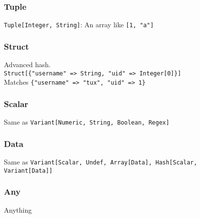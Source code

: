 \begin{frame}\frametitle{Tuple}
    \begin{center}
\LARGE
\texttt{Tuple[Integer, String]}: An array like \texttt{[1, "a"]}
    \end{center}
\end{frame}
\begin{frame}\frametitle{Struct}
    \begin{center}
\LARGE
Advanced hash.\\
\texttt{Struct[\{"username" => String, "uid" => Integer[0]\}]}\\
Matches \texttt{\{"username" => "tux", "uid" => 1\}}
    \end{center}
\end{frame}
\begin{frame}\frametitle{Scalar}
    \begin{center}
\LARGE
Same as \texttt{Variant[Numeric, String, Boolean, Regex]}
    \end{center}
\end{frame}
\begin{frame}\frametitle{Data}
    \begin{center}
\LARGE
Same as \texttt{Variant[Scalar, Undef, Array[Data], Hash[Scalar, Variant[Data]]}
    \end{center}
\end{frame}
\begin{frame}\frametitle{Any}
    \begin{center}
\LARGE
Anything
    \end{center}
\end{frame}

